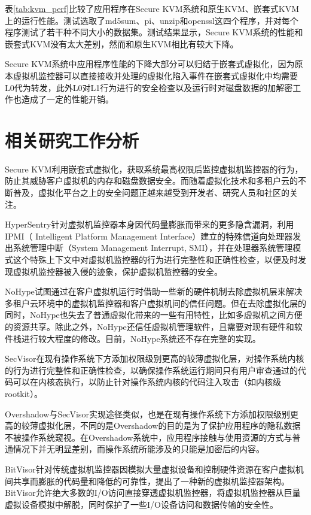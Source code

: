 表\ref{tab:kvm_perf}比较了应用程序在Secure KVM系统和原生KVM、嵌套式KVM上的运行性能。测试选取了md5sum、pi、unzip和openssl这四个程序，并对每个程序测试了若干种不同大小的数据集。测试结果显示，Secure KVM系统的性能和嵌套式KVM没有太大差别，然而和原生KVM相比有较大下降。

Secure KVM系统中应用程序性能的下降大部分可以归结于嵌套式虚拟化，因为原本虚拟机监控器可以直接接收并处理的虚拟化陷入事件在嵌套式虚拟化中均需要L0代为转发，此外L0对L1行为进行的安全检查以及运行时对磁盘数据的加解密工作也造成了一定的性能开销。


\section{相关研究工作分析}

Secure KVM利用嵌套式虚拟化，获取系统最高权限后监控虚拟机监控器的行为，防止其威胁客户虚拟机的内存和磁盘数据安全。而随着虚拟化技术和多租户云的不断普及，虚拟化平台之上的安全问题正越来越受到开发者、研究人员和社区的关注。

HyperSentry针对虚拟机监控器本身因代码量膨胀而带来的更多隐含漏洞，利用IPMI（ Intelligent Platform Management Interface）建立的特殊信道向处理器发出系统管理中断（System Management Interrupt, SMI），并在处理器系统管理模式这个特殊上下文中对虚拟机监控器的行为进行完整性和正确性检查，以便及时发现虚拟机监控器被入侵的迹象，保护虚拟机监控器的安全。

NoHype试图通过在客户虚拟机运行时借助一些新的硬件机制去除虚拟机层来解决多租户云环境中的虚拟机监控器和客户虚拟机间的信任问题。但在去除虚拟化层的同时，NoHype也失去了普通虚拟化带来的一些有用特性，比如多虚拟机之间方便的资源共享。除此之外，NoHype还信任虚拟机管理软件，且需要对现有硬件和软件栈进行较大程度的修改。目前，NoHype系统还不存在完整的实现。

SecVisor在现有操作系统下方添加权限级别更高的较薄虚拟化层，对操作系统内核的行为进行完整性和正确性检查，以确保操作系统运行期间只有用户审查通过的代码可以在内核态执行，以防止针对操作系统内核的代码注入攻击（如内核级rootkit）。

Overshadow与SecVisor实现途径类似，也是在现有操作系统下方添加权限级别更高的较薄虚拟化层，不同的是Overshadow的目的是为了保护应用程序的隐私数据不被操作系统窥视。在Overshadow系统中，应用程序接触与使用资源的方式与普通情况下并无明显差别，而操作系统所能涉及的只能是加密后的内容。

BitVisor针对传统虚拟机监控器因模拟大量虚拟设备和控制硬件资源在客户虚拟机间共享而膨胀的代码量和降低的可靠性，提出了一种新的虚拟机监控器架构。BitVisor允许绝大多数的I/O访问直接穿透虚拟机监控器，将虚拟机监控器从巨量虚拟设备模拟中解脱，同时保护了一些I/O设备访问和数据传输的安全性。

